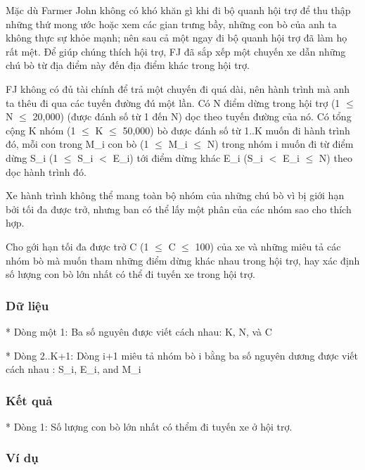 



   Mặc dù Farmer John không có khó khăn gì khi đi bộ quanh hội trợ để thu thập những thứ mong ước hoặc xem các gian trưng bầy, những con bò của anh ta không thực sự khỏe mạnh; nên sau cả một ngay đi bộ quanh hội trợ đã làm họ rất mệt. Để giúp chúng thích hội trợ, FJ đã sắp xếp một chuyến xe dẫn những chú bò từ địa điểm này đến địa điểm khác trong hội trợ.  

   FJ không có đủ tài chính để trả một chuyến đi quá dài, nên hành trình mà  anh ta thêu đi qua các tuyến đường đú một lần. Có N điểm dừng trong hội  trợ (1  $\le$  N  $\le$  20,000) (được đánh số từ 1 đến N) dọc theo tuyến đường của  nó. Có tổng cộng K nhóm (1  $\le$  K  $\le$  50,000) bò được đánh số từ 1..K muốn đi hành trình đó, mỗi con trong M\_i con bò (1  $\le$  M\_i  $\le$  N) trong nhóm i  muốn đi từ điểm dừng S\_i (1  $\le$  S\_i $<$ E\_i) tới điểm dừng khác E\_i  (S\_i $<$ E\_i  $\le$  N) theo dọc hành trình đó.  

   Xe hành trình không thể mang toàn bộ nhóm của những chú bò vì bị giới hạn  bởi tối đa được trở, nhưng ban có thể lấy một phân của các nhóm sao cho thích hợp.   




   Cho gới hạn tối đa được trở C (1  $\le$  C  $\le$  100) của xe và những miêu tả các  nhóm bò mà muốn tham những điểm dừng khác nhau trong hội trợ, hay xác định  số lượng con bò lớn nhất có thể đi tuyến xe trong hội trợ.  

\subsubsection{   Dữ liệu  }

   * Dòng một 1: Ba số nguyên được viết cách nhau: K, N, và C  

   * Dòng 2..K+1: Dòng i+1 miêu tả nhóm bò i bằng ba số nguyên dương được viết cách nhau : S\_i, E\_i, and M\_i  

\subsubsection{   Kết quả  }

   * Dòng 1: Số lượng con bò lớn nhất có thểm đi tuyến xe ở hội trợ.  

\subsubsection{   Ví dụ  }

